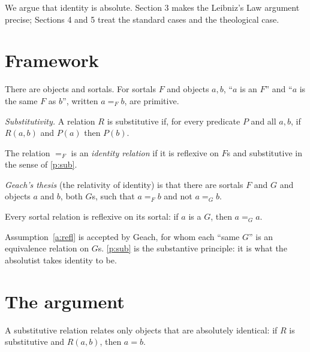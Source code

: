 \documentclass{situationist-preprint}
\begin{document}
We argue that identity is absolute. Section 3 makes the Leibniz's Law argument precise; Sections 4 and 5 treat the standard cases and the theological case.

\section{Framework}

\begin{definition}\label{d:prim}
There are objects and sortals. For sortals $F$ and objects $a, b$, \enquote{$a$ is an $F$} and \enquote{$a$ is the same $F$ as $b$}, written $a =_F b$, are primitive.
\end{definition}

\begin{principle}\label{p:sub}
\emph{Substitutivity.} A relation $R$ is substitutive if, for every predicate $P$ and all $a, b$, if $R(a, b)$ and $P(a)$ then $P(b)$.
\end{principle}

\begin{definition}\label{d:id}
The relation $=_F$ is an \emph{identity relation} if it is reflexive on $F$s and substitutive in the sense of \ref{p:sub}.
\end{definition}

\begin{definition}\label{d:rel}
\emph{Geach's thesis} (the relativity of identity) is that there are sortals $F$ and $G$ and objects $a$ and $b$, both $G$s, such that $a =_F b$ and not $a =_G b$.
\end{definition}

\begin{assumption}\label{a:refl}
Every sortal relation is reflexive on its sortal: if $a$ is a $G$, then $a =_G a$.
\end{assumption}

Assumption~\ref{a:refl} is accepted by Geach, for whom each \enquote{same $G$} is an equivalence relation on $G$s. \ref{p:sub} is the substantive principle: it is what the absolutist takes identity to be.

\section{The argument}

\begin{theorem}\label{t:abs}
A substitutive relation relates only objects that are absolutely identical: if $R$ is substitutive and $R(a, b)$, then $a = b$.
\end{theorem}
\end{document}
